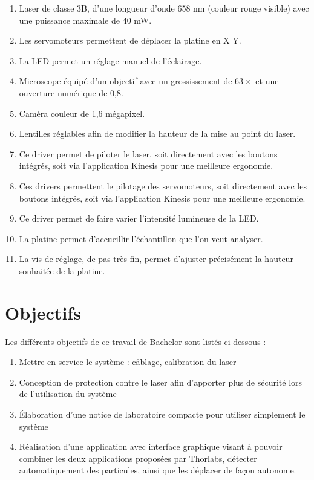 \begin{enumerate}
    \item Laser de classe 3B, d'une longueur d'onde 658 nm (couleur rouge visible) avec une puissance maximale de 40 mW.
    \item Les servomoteurs permettent de déplacer la platine en X Y.
    \item La LED permet un réglage manuel de l'éclairage.
    \item Microscope équipé d'un objectif avec un grossissement de $63\times$ et une ouverture numérique de 0,8.
    \item Caméra couleur de 1,6 mégapixel.
    \item Lentilles réglables afin de modifier la hauteur de la mise au point du laser.
    \item Ce driver permet de piloter le laser, soit directement avec les boutons intégrés, soit via l'application Kinesis \cite{kinesisSoftware} pour une meilleure ergonomie.
    \item Ces drivers permettent le pilotage des servomoteurs, soit directement avec les boutons intégrés, soit via l'application Kinesis pour une meilleure ergonomie.
    \item Ce driver permet de faire varier l'intensité lumineuse de la LED.
    \item La platine permet d'accueillir l'échantillon que l'on veut analyser.
    \item La vis de réglage, de pas très fin, permet d'ajuster précisément la hauteur souhaitée de la platine.
\end{enumerate}

\section{Objectifs}

Les différents objectifs de ce travail de Bachelor sont listés ci-dessous :
\begin{enumerate}
    \item Mettre en service le système : câblage, calibration du laser
    \item Conception de protection contre le laser afin d'apporter plus de sécurité lors de l'utilisation du système
    \item Élaboration d'une notice de laboratoire compacte pour utiliser simplement le système
    \item Réalisation d'une application avec interface graphique visant à pouvoir combiner les deux applications proposées par Thorlabs, détecter automatiquement des particules, ainsi que les déplacer de façon autonome.
\end{enumerate}

